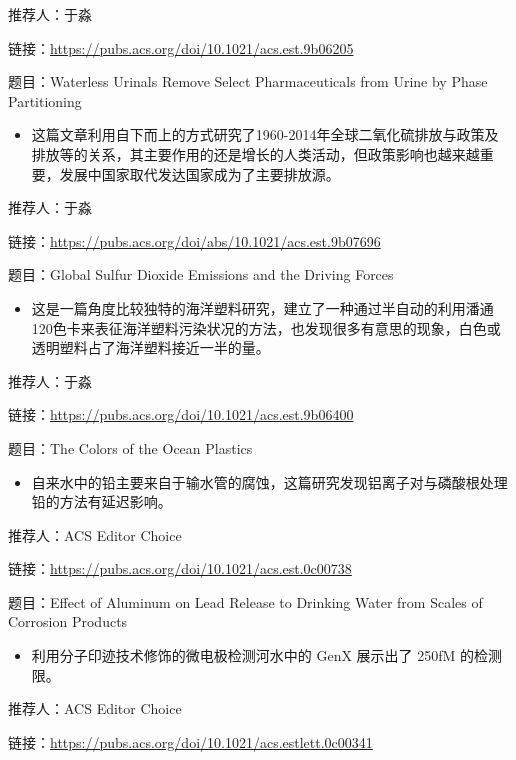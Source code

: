 \documentclass[
]{book}
\providecommand{\tightlist}{%
  \setlength{\itemsep}{0pt}\setlength{\parskip}{0pt}}
\begin{document}
推荐人：于淼

链接：\url{https://pubs.acs.org/doi/10.1021/acs.est.9b06205}

题目：Waterless Urinals Remove Select Pharmaceuticals from Urine by Phase Partitioning

\begin{itemize}
\tightlist
\item
  这篇文章利用自下而上的方式研究了1960-2014年全球二氧化硫排放与政策及排放等的关系，其主要作用的还是增长的人类活动，但政策影响也越来越重要，发展中国家取代发达国家成为了主要排放源。
\end{itemize}

推荐人：于淼

链接：\url{https://pubs.acs.org/doi/abs/10.1021/acs.est.9b07696}

题目：Global Sulfur Dioxide Emissions and the Driving Forces

\begin{itemize}
\tightlist
\item
  这是一篇角度比较独特的海洋塑料研究，建立了一种通过半自动的利用潘通120色卡来表征海洋塑料污染状况的方法，也发现很多有意思的现象，白色或透明塑料占了海洋塑料接近一半的量。
\end{itemize}

推荐人：于淼

链接：\url{https://pubs.acs.org/doi/10.1021/acs.est.9b06400}

题目：The Colors of the Ocean Plastics

\begin{itemize}
\tightlist
\item
  自来水中的铅主要来自于输水管的腐蚀，这篇研究发现铝离子对与磷酸根处理铅的方法有延迟影响。
\end{itemize}

推荐人：ACS Editor Choice

链接：\url{https://pubs.acs.org/doi/10.1021/acs.est.0c00738}

题目：Effect of Aluminum on Lead Release to Drinking Water from Scales of Corrosion Products

\begin{itemize}
\tightlist
\item
  利用分子印迹技术修饰的微电极检测河水中的 GenX 展示出了 250fM 的检测限。
\end{itemize}

推荐人：ACS Editor Choice

链接：\url{https://pubs.acs.org/doi/10.1021/acs.estlett.0c00341}
\end{document}
